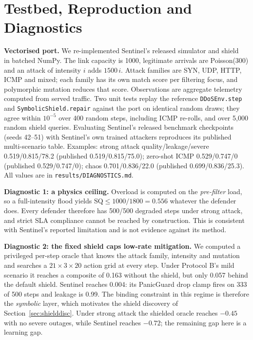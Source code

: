 \section{Testbed, Reproduction and Diagnostics}
\label{sec:diagnostics}
\textbf{Vectorised port.} We re-implemented Sentinel's released simulator and
shield~\cite{sentinelcode} in batched NumPy. The link capacity is 1000,
legitimate arrivals are Poisson(300) and an attack of intensity $i$ adds
$1500\,i$. Attack families are SYN, UDP, HTTP, ICMP and mixed; each family has
its own match score per filtering focus, and polymorphic mutation reduces that
score. Observations are aggregate telemetry computed from served traffic. Two
unit tests replay the reference \texttt{DDoSEnv.step} and
\texttt{SymbolicShield.repair} against the port on identical random draws; they
agree within $10^{-5}$ over 400 random steps, including ICMP re-rolls, and over
5{,}000 random shield queries. Evaluating Sentinel's released
benchmark checkpoints (seeds 42--51) with Sentinel's own trained attackers
reproduces its published multi-scenario table. Examples: strong attack
quality/leakage/severe 0.519/0.815/78.2 (published 0.519/0.815/75.0); zero-shot
ICMP 0.529/0.747/0 (published 0.529/0.747/0); chaos 0.701/0.836/22.0
(published 0.699/0.836/25.3). All values are in \texttt{results/DIAGNOSTICS.md}.

\textbf{Diagnostic 1: a physics ceiling.} Overload is computed on the
\emph{pre-filter} load, so a full-intensity flood yields
$\mathrm{SQ}\le 1000/1800=0.556$ whatever the defender does. Every defender
therefore has 500/500 degraded steps under strong attack, and strict SLA
compliance cannot be reached by construction. This is consistent with
Sentinel's reported limitation and is not evidence against its method.

\textbf{Diagnostic 2: the fixed shield caps low-rate mitigation.} We computed
a privileged per-step oracle that knows the attack family, intensity and
mutation and searches a $21\times3\times20$ action grid at every step. Under
Protocol B's mild scenario it reaches a composite of 0.163 without the shield,
but only 0.057 behind the default shield. Sentinel reaches 0.004: its
PanicGuard drop clamp fires on 333 of 500 steps and leakage is 0.99. The
binding constraint in this regime is therefore the \emph{symbolic} layer, which
motivates the shield discovery of Section~\ref{sec:shielddisc}. Under strong
attack the shielded oracle reaches $-0.45$ with no severe outages, while
Sentinel reaches $-0.72$; the remaining gap here is a learning gap.


